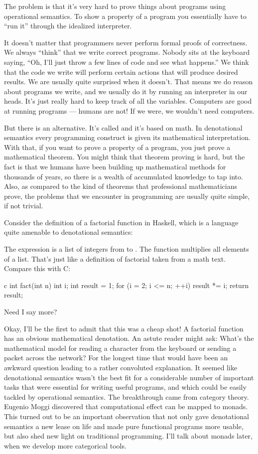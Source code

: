 The problem is that it's very hard to prove things about programs using
operational semantics. To show a property of a program you essentially
have to ``run it'' through the idealized interpreter.

It doesn't matter that programmers never perform formal proofs of
correctness. We always ``think'' that we write correct programs. Nobody
sits at the keyboard saying, ``Oh, I'll just throw a few lines of code
and see what happens.'' We think that the code we write will perform
certain actions that will produce desired results. We are usually quite
surprised when it doesn't. That means we do reason about programs we
write, and we usually do it by running an interpreter in our heads. It's
just really hard to keep track of all the variables. Computers are good
at running programs --- humans are not! If we were, we wouldn't need
computers.

But there is an alternative. It's called 
and it's based on math. In denotational semantics every programming
construct is given its mathematical interpretation. With that, if you
want to prove a property of a program, you just prove a mathematical
theorem. You might think that theorem proving is hard, but the fact is
that we humans have been building up mathematical methods for thousands
of years, so there is a wealth of accumulated knowledge to tap into.
Also, as compared to the kind of theorems that professional
mathematicians prove, the problems that we encounter in programming are
usually quite simple, if not trivial.

Consider the definition of a factorial function in Haskell, which is a
language quite amenable to denotational semantics:

The expression \code{{[}1..n{]}} is a list of integers from  to .
The function  multiplies all elements of a list. That's
just like a definition of factorial taken from a math text. Compare this
with C:

\begin{snip}{c}
int fact(int n) {
    int i;
    int result = 1;
    for (i = 2; i <= n; ++i)
        result *= i;
    return result;
}
\end{snip}
Need I say more?

Okay, I'll be the first to admit that this was a cheap shot! A factorial
function has an obvious mathematical denotation. An astute reader might
ask: What's the mathematical model for reading a character from the
keyboard or sending a packet across the network? For the longest time
that would have been an awkward question leading to a rather convoluted
explanation. It seemed like denotational semantics wasn't the best fit
for a considerable number of important tasks that were essential for
writing useful programs, and which could be easily tackled by
operational semantics. The breakthrough came from category theory.
Eugenio Moggi discovered that computational effect can be mapped to
monads. This turned out to be an important observation that not only
gave denotational semantics a new lease on life and made pure functional
programs more usable, but also shed new light on traditional
programming. I'll talk about monads later, when we develop more
categorical tools.

